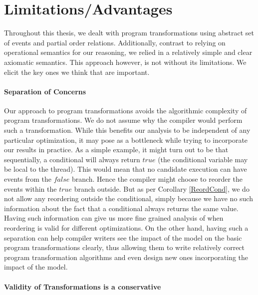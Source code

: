 \section{Limitations/Advantages}

    Throughout this thesis, we dealt with program transformations using abstract set of events and partial order relations. 
    Additionally, contrast to relying on operational semantics for our reasoning, we relied in a relatively simple and clear axiomatic semantics. 
    This approach however, is not without its limitations. 
    We elicit the key ones we think that are important. 

    \paragraph{Separation of Concerns}
    Our approach to program transformations avoids the algorithmic complexity of program transformations. 
    We do not assume why the compiler would perform such a transformation.
    While this benefits our analysis to be independent of any particular optimization, it may pose as a bottleneck while trying to incorporate our results in practice. 
    As a simple example, it might turn out to be that sequentially, a conditional will always return $true$ (the conditional variable may be local to the thread). 
    This would mean that no candidate execution can have events from the $false$ branch. 
    Hence the compiler might choose to reorder the events within the $true$ branch outside. 
    But as per Corollary \ref{ReordCond}, we do not allow any reordering outside the conditional, simply because we have no such information about the fact that a conditional always returns the same value. 
    Having such information can give us more fine grained analysis of when reordering is valid for different optimizations. 
    On the other hand, having such a separation can help compiler writers see the impact of the model on the basic program transformations clearly, thus allowing them to write relatively correct program transformation algorithms and even design new ones incorporating the impact of the model. 

    \paragraph{Validity of Transformations is a conservative}

